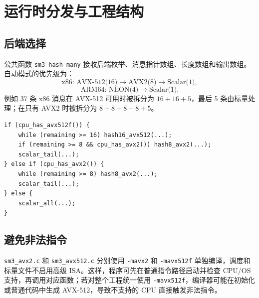 \documentclass[UTF8,a4paper,12pt]{ctexart}
\newcommand{\code}[1]{\texttt{#1}}
\begin{document}
\section{运行时分发与工程结构}

\subsection{后端选择}
公共函数 \code{sm3\_hash\_many} 接收后端枚举、消息指针数组、长度数组和输出数组。自动模式的优先级为：
\begin{equation}
\text{x86: AVX-512(16)}\rightarrow\text{AVX2(8)}\rightarrow\text{Scalar(1)},
\end{equation}
\begin{equation}
\text{ARM64: NEON(4)}\rightarrow\text{Scalar(1)}.
\end{equation}
例如 37 条 x86 消息在 AVX-512 可用时被拆分为 $16+16+5$，最后 5 条由标量处理；在只有 AVX2 时被拆分为 $8+8+8+8+5$。

\begin{lstlisting}[style=cstyle,caption={x86 自动分发逻辑（简化）}]
if (cpu_has_avx512f()) {
    while (remaining >= 16) hash16_avx512(...);
    if (remaining >= 8 && cpu_has_avx2()) hash8_avx2(...);
    scalar_tail(...);
} else if (cpu_has_avx2()) {
    while (remaining >= 8) hash8_avx2(...);
    scalar_tail(...);
} else {
    scalar_all(...);
}
\end{lstlisting}

\subsection{避免非法指令}
\code{sm3\_avx2.c} 和 \code{sm3\_avx512.c} 分别使用 \code{-mavx2} 和 \code{-mavx512f} 单独编译，调度和标量文件不启用高级 ISA。这样，程序可先在普通指令路径启动并检查 CPU/OS 支持，再调用对应函数；若对整个工程统一使用 \code{-mavx512f}，编译器可能在初始化或普通代码中生成 AVX-512，导致不支持的 CPU 直接触发非法指令。
\end{document}
